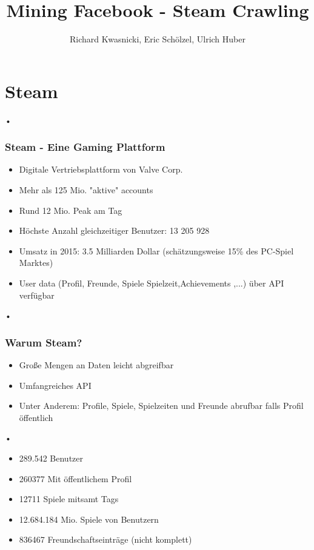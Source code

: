 \documentclass[12pt]{beamer}
\author{Richard Kwasnicki, Eric Schölzel, Ulrich Huber}
\title{Mining Facebook - Steam Crawling}
\begin{document}
\begin{frame}
\titlepage
\end{frame}

\section{Steam}
\begin{frame}{•}
\frametitle{Steam - Eine Gaming Plattform}
\begin{itemize}
\item Digitale Vertriebsplattform von Valve Corp.
\item Mehr als 125 Mio. "aktive" accounts
\item Rund 12 Mio. Peak am Tag
\item Höchste Anzahl gleichzeitiger Benutzer: 13 205 928
\item Umsatz in 2015:  3.5 Milliarden Dollar (schätzungsweise 15\% des PC-Spiel Marktes)
\item User data (Profil, Freunde, Spiele Spielzeit,\newline Achievements ,...) über API verfügbar
\end{itemize}

\end{frame}

\begin{frame}{•}
\frametitle{Warum Steam?}
\begin{itemize}
\item Große Mengen an Daten leicht abgreifbar
\item Umfangreiches API
\item Unter Anderem: Profile, Spiele, Spielzeiten und Freunde abrufbar falls Profil öffentlich 
\end{itemize}
\end{frame}

\begin{frame}{•}
\begin{itemize}
\frametitle{Alle gesammelten Daten}
\item 289.542 Benutzer
\item 260377 Mit öffentlichem Profil
\item 12711 Spiele mitsamt Tags
\item 12.684.184 Mio. Spiele von Benutzern
\item 836467 Freundschaftseinträge (nicht komplett)
\end{itemize}
\end{frame}
\end{document}
